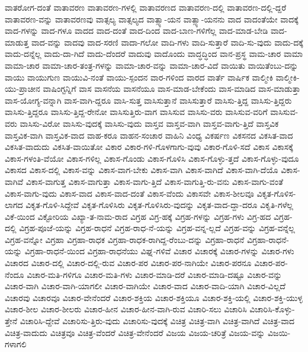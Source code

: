 {ವಾತರೋಗ-ದಂತೆ
ವಾತಾವರಣ
ವಾತಾವರಣ-ಗಳಲ್ಲಿ
ವಾತಾವರಣದ
ವಾತಾವರಣ-ದಲ್ಲಿ
ವಾತಾವರಣ-ದಲ್ಲಿ-ದ್ದರೆ
ವಾತಾವರಣ-ವನ್ನು
ವಾತಾವರಣವು
ವಾತ್ಸಲ್ಯ
ವಾತ್ಸಲ್ಯದ
ವಾತ್ಸ್ಯಾ-ಯನ
ವಾತ್ಸ್ಯಾ-ಯನನು
ವಾದ
ವಾದಂತೆಯೇ
ವಾದಕ್ಕೆ
ವಾದ-ಗಳನ್ನು
ವಾದ-ಗಳೂ
ವಾದದ
ವಾದ-ದಂತೆ
ವಾದ-ದಿಂದ
ವಾದ-ಬಾಣ-ಗಳಿಗೆಲ್ಲ
ವಾದ-ಮಾಡ-ಬೇಡಿ
ವಾದ-ಮಾಡುತ್ತ
ವಾದ-ವನ್ನು
ವಾದವು
ವಾದ-ಸರಣಿ
ವಾದಾ-ಗಲೋ
ವಾದಿ-ಗಳು
ವಾದಿ-ಸುತ್ತಾರೆ
ವಾದಿ-ಸು-ವುದು
ವಾದು-ದಕ್ಕೆ
ವಾದು-ದನ್ನೆಲ್ಲ
ವಾದು-ದಾ-ಗಿದೆ
ವಾದು-ದೆಂದರೆ
ವಾದುವು
ವಾದೊಂದು
ವಾದ್ಧದ್ಧಿಂದ
ವಾನ-ಪ್ರಸ್ಥ
ವಾಮ-ಚಾರ
ವಾಮಾ
ವಾಮಾ-ಚಾರ
ವಾಮಾ-ಚಾರ-ತಂತ್ರ-ಗಳನ್ನು
ವಾಮಾ-ಚಾರ-ವನ್ನು
ವಾಮಾ-ಚಾರ-ವಿದೆ
ವಾಯಿತು
ವಾಯಿತೆಂಬು-ದನ್ನು
ವಾಯು
ವಾಯುಗುಣ
ವಾಯುವಿ-ನಂತೆ
ವಾಯು-ಸ್ಪಂದನ
ವಾರ-ಗಳಿಂದ
ವಾರದ
ವಾರ್ತೆ
ವಾರ್ಷಿಕ
ವಾಲ್ಮೀಕಿ
ವಾಲ್ಮೀಕಿ-ಯು-ಪ್ರಾಚೀನ
ವಾಷಿಂಗ್ಟನ್ನಿಗೆ
ವಾಸ
ವಾಸನೆಯ
ವಾಸನೆಯೂ
ವಾಸ-ಮಾಡ-ಬೇಕೆಂದು
ವಾಸ-ಮಾಡಿದ
ವಾಸ-ಮಾಡುತ್ತಾ
ವಾಸ-ಯೋಗ್ಯ-ವನ್ನಾಗಿ
ವಾಸ-ವಾಗಿ-ದ್ದರೂ
ವಾಸಿ-ಸುತ್ತ
ವಾಸಿಸುತ್ತಾನೆ
ವಾಸಿಸುತ್ತಾರೆ
ವಾಸಿಸು-ತ್ತಿದ್ದ
ವಾಸಿಸು-ತ್ತಿದ್ದರು
ವಾಸಿಸು-ತ್ತಿದ್ದರೂ
ವಾಸಿಸು-ತ್ತಿದ್ದ-ರೇನೋ
ವಾಸಿಸುತ್ತಿರು-ವಾಗ
ವಾಸಿಸುವ
ವಾಸಿಸು-ವರು
ವಾಸಿಸುವ-ವರಿಗೆ
ವಾಸಿಸುವ-ವರು
ವಾಸಿಸು-ವಿರೋ
ವಾಸಿಸು-ವುದಕ್ಕೆ
ವಾಸಿಸು-ವುದು
ವಾಸ್ತವ
ವಾಸ್ತವ-ವಾಗಿ
ವಾಸ್ತವ-ವಾಗು-ತ್ತಿದೆ
ವಾಸ್ತವಿಕ
ವಾಸ್ತವಿಕ-ವಾಗಿ
ವಾಸ್ತವಿಕ-ವಾದ
ವಾಹ-ಕರೂ
ವಾಹನ-ಸಂಚಾರ
ವಾಹಿನಿ
ವಿಂಧ್ಯ
ವಿಕರ್ಷಣ
ವಿಕಸನದ
ವಿಕಸಿತ-ವಾದ
ವಿಕಸಿತ-ವಾದುದು
ವಿಕಸಿತ-ವಾಯಿತೋ
ವಿಕಾರ
ವಿಕಾರ-ಗಳಿ-ಗೊಳಗಾಗು-ವುವು
ವಿಕಾರ-ಗೊಳಿ-ಸದೆ
ವಿಕಾಸ
ವಿಕಾಸಕ್ಕೆ
ವಿಕಾಸ-ಗಳಂತಿ-ವೆಯೋ
ವಿಕಾಸ-ಗಳಿಲ್ಲ
ವಿಕಾಸ-ಗೊಂಡು
ವಿಕಾಸ-ಗೊಳಿಸಿ
ವಿಕಾಸ-ಗೊಳ್ಳು-ತ್ತದೆ
ವಿಕಾಸ-ಗೊಳ್ಳು-ವುದೂ
ವಿಕಾಸದ
ವಿಕಾಸ-ದಲ್ಲಿ
ವಿಕಾಸ-ವನ್ನು
ವಿಕಾಸ-ವಾಗ-ಬೇಕು
ವಿಕಾಸ-ವಾಗಿ
ವಿಕಾಸ-ವಾಗಿದೆ
ವಿಕಾಸ-ವಾಗಿ-ದೆಯೊ
ವಿಕಾಸ-ವಾಗಿವೆ
ವಿಕಾಸ-ವಾಗುತ್ತ
ವಿಕಾಸ-ವಾಗುತ್ತಾ
ವಿಕಾಸ-ವಾಗು-ತ್ತಿದೆ
ವಿಕಾಸ-ವಾಗುತ್ತಿ-ರು-ವನು
ವಿಕಾಸ-ವಾಗು-ವಂತೆ
ವಿಕಾಸ-ವಾಗು-ವುದು
ವಿಕಾಸ-ವಾದ
ವಿಕಾಸ-ವಾದ-ದಂತೆ
ವಿಕಾಸ-ವೆಂದು
ವಿಕಾಸವೇ
ವಿಕಾಸ-ಶೀಲವೂ
ವಿಕೃತ-ಗೊಳಿಸ-ಲಾಗದ
ವಿಕೃತ-ಗೊಳಿ-ಸಿದ್ದೇವೆ
ವಿಕೃತ-ಗೊಳಿಸಿರು
ವಿಕೃತ-ಗೊಳಿಸಿರು-ವುದನ್ನು
ವಿಕೃತ-ವಾದ-ದ್ದಾ-ದರೂ
ವಿಕೃತಿ-ಗಳೆಲ್ಲ
ವಿಕೆ-ಯಿಂದ
ವಿಕ್ಟೋರಿಯ
ವಿಖ್ಯಾ-ತ-ನಾಮ-ರಾದ
ವಿಗ್ರಹ
ವಿಗ್ರ-ಹಕ್ಕೆ
ವಿಗ್ರಹ-ಗಳನ್ನು
ವಿಗ್ರಹ-ಗಳು
ವಿಗ್ರ-ಹದ
ವಿಗ್ರಹ-ದಲ್ಲಿ
ವಿಗ್ರಹ-ಪೂಜೆ-ಯನ್ನು
ವಿಗ್ರಹ-ರಾಧನೆ
ವಿಗ್ರಹ-ರಾಧ-ನೆ-ಯನ್ನು
ವಿಗ್ರಹ-ವನ್ನ-ಲ್ಲದೆ
ವಿಗ್ರಹ-ವನ್ನು
ವಿಗ್ರಹ-ವನ್ನೆಲ್ಲ
ವಿಗ್ರಹ-ವನ್ನೋ
ವಿಗ್ರಹಾ
ವಿಗ್ರಹಾ-ರಾಧಕ
ವಿಗ್ರಹಾ-ರಾಧಕ-ರಾಗಿದ್ದ-ರೆಂಬು-ದನ್ನು
ವಿಗ್ರಹಾ-ರಾಧನೆ
ವಿಗ್ರಹಾ-ರಾಧನೆ-ಯನ್ನು
ವಿಗ್ರಹಾ-ರಾಧನೆ-ಯಿಂದ
ವಿಗ್ರಹಾ-ರಾಧನೆಯು
ವಿಘ್ನ-ಗಳಿವೆ
ವಿಚಾರ
ವಿಚಾರಕ್ಕೆ
ವಿಚಾರ-ಗಳನ್ನು
ವಿಚಾರ-ಗಳು
ವಿಚಾರದ
ವಿಚಾರ-ದಲ್ಲಿ
ವಿಚಾರ-ದಲ್ಲಿ-ರುವ
ವಿಚಾರ-ಪರ
ವಿಚಾರ-ಪರ-ನಾಗಿಯೇ
ವಿಚಾರ-ಪರನೂ
ವಿಚಾರ-ಪರ-ನೆಂದೂ
ವಿಚಾರ-ಮತಿ-ಗಳಿಗೂ
ವಿಚಾರ-ಮತಿ-ಗಳು
ವಿಚಾರ-ಮಾಡಿ-ದರೆ
ವಿಚಾರ-ಮಾಡಿ-ದಷ್ಟೂ
ವಿಚಾರ-ವನ್ನು
ವಿಚಾರ-ವಾಗಿ
ವಿಚಾರ-ವಾಗಿ-ಯಾಗಲೀ
ವಿಚಾರ-ವಾಗಿಯೇ
ವಿಚಾರ-ವಾದ
ವಿಚಾರ-ವಾದಿ-ಯಾಗಿ
ವಿಚಾರ-ವಿಲ್ಲದೆ
ವಿಚಾರವು
ವಿಚಾರವೂ
ವಿಚಾರ-ವೇನೆಂದರೆ
ವಿಚಾರ-ಶಕ್ತಿಯ
ವಿಚಾರ-ಶಕ್ತಿಯೂ
ವಿಚಾರ-ಶಕ್ತಿ-ಯಲ್ಲಿ
ವಿಚಾರ-ಶಕ್ತಿ-ಯುಳ್ಳ
ವಿಚಾರ-ಶೀಲ
ವಿಚಾರ-ಶೀಲರು
ವಿಚಾರ-ಹೀನ
ವಿಚಾರ-ಹೀನ-ವಾಗಿ-ರುವ
ವಿಚಾರಿ-ಸಲು
ವಿಚಾರಿಸಿ
ವಿಚಾರಿಸಿ-ಕೊಳ್ಳು-ತ್ತೇನೆ
ವಿಚಾರಿಸಿ-ದ್ದೇವೆ
ವಿಚಾರಿಸು-ತ್ತಿರು-ವುದು
ವಿಚಾರಿಸು-ವುದಕ್ಕೆ
ವಿಚಿತ್ರ
ವಿಚಿತ್ರ-ವಾಗಿ
ವಿಚಿತ್ರ-ವಾಗಿದೆ
ವಿಚಿತ್ರ-ವಾದ
ವಿಚಿತ್ರ-ವಾದುದು
ವಿಚಿತ್ರವೂ
ವಿಚಿತ್ರ-ವೆಂದರೆ
ವಿಚಿತ್ರ-ವೇನೆಂದರೆ
ವಿಜಯ
ವಿಜಯ-ಚರಿತ್ರೆ
ವಿಜಯ-ವನ್ನು
ವಿಜಯಿ-ಗಳಾಗಲಿ
}
